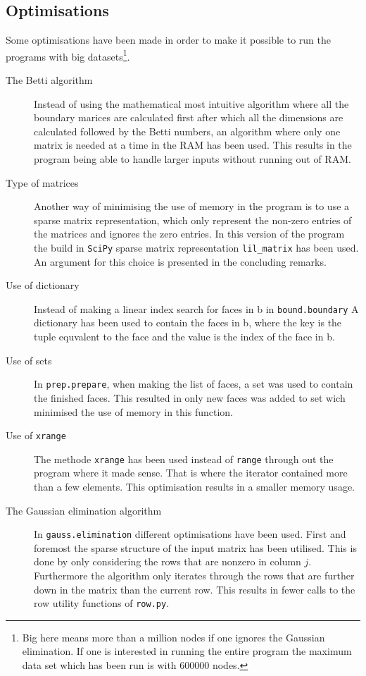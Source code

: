 \documentclass[11pt,a4paper,twoside]{report}
\begin{document}
\subsection{Optimisations}
Some optimisations have been made in order to make it possible to run the programs with big datasets\footnote{Big here means more than a million nodes if one ignores the Gaussian elimination. If one is interested in running the entire program the maximum data set which has been run is with 600000 nodes.}.
\begin{description}
\item[The Betti algorithm] Instead of using the mathematical most intuitive algorithm where all the boundary marices are calculated first after which all the dimensions are calculated followed by the Betti numbers, an algorithm where only one matrix is needed at a time in the RAM has been used. This results in the program being able to handle larger inputs without running out of RAM.
\item[Type of matrices] Another way of minimising the use of memory in the program is to use a sparse matrix representation, which only represent the non-zero entries of the matrices and ignores the zero entries. In this version of the program the build in \texttt{SciPy} sparse matrix representation \texttt{lil\_matrix} has been used. An argument for this choice is presented in the concluding remarks.
\item[Use of dictionary] Instead of making a linear index search for faces in b in \texttt{bound.boundary} A dictionary has been used to contain the faces in b, where the key is the tuple equvalent to the face and the value is the index of the face in b.
\item[Use of sets] In \texttt{prep.prepare}, when making the list of faces, a set was used to contain the finished faces. This resulted in only new faces was added to set wich minimised the use of memory in this function.
\item[Use of \texttt{xrange}] The methode \texttt{xrange} has been used instead of \texttt{range} through out the program where it made sense. That is where the iterator contained more than a few elements. This optimisation results in a smaller memory usage.
\item[The Gaussian elimination algorithm] In \texttt{gauss.elimination} different optimisations have been used. First and foremost the sparse structure of the input matrix has been utilised. This is done by only considering the rows that are nonzero in column $j$. Furthermore the algorithm only iterates through the rows that are further down in the matrix than the current row. This results in fewer calls to the row utility functions of \texttt{row.py}.

\end{description}
\end{document}
